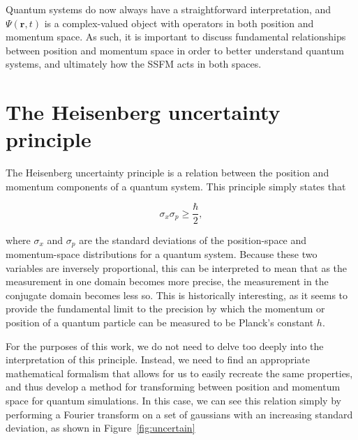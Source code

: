 Quantum systems do now always have a straightforward interpretation, and $\Psi(\mathbf{r},t)$ is a complex-valued object with operators in both position and momentum space.
As such, it is important to discuss fundamental relationships between position and momentum space in order to better understand quantum systems, and ultimately how the SSFM acts in both spaces.

\section{The Heisenberg uncertainty principle}


The Heisenberg uncertainty principle is a relation between the position and momentum components of a quantum system.
This principle simply states that

$$
\sigma_x \sigma_p \geq \frac{\hbar}{2},
$$

where $\sigma_x$ and $\sigma_p$ are the standard deviations of the position-space and momentum-space distributions for a quantum system.
Because these two variables are inversely proportional, this can be interpreted to mean that as the measurement in one domain becomes more precise, the measurement in the conjugate domain becomes less so.
This is historically interesting, as it seems to provide the fundamental limit to the precision by which the momentum or position of a quantum particle can be measured to be Planck's constant $h$.

For the purposes of this work, we do not need to delve too deeply into the interpretation of this principle.
Instead, we need to find an appropriate mathematical formalism that allows for us to easily recreate the same properties, and thus develop a method for transforming between position and momentum space for quantum simulations.
In this case, we can see this relation simply by performing a Fourier transform on a set of gaussians with an increasing standard deviation, as shown in Figure~\ref{fig:uncertain}

